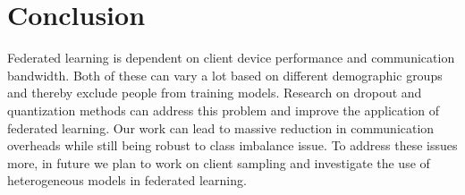 \documentclass{article}
\begin{document}
\section{Conclusion}

Federated learning is dependent on client device performance and communication bandwidth. Both of these can vary a lot based on different demographic groups and thereby exclude people from training models. Research on dropout and quantization methods can address this problem and improve the application of federated learning. Our work can lead to massive reduction in communication overheads while still being robust to class imbalance issue. To address these issues more, in future we plan to work on client sampling and investigate the use of heterogeneous models in federated learning.






\end{document}
